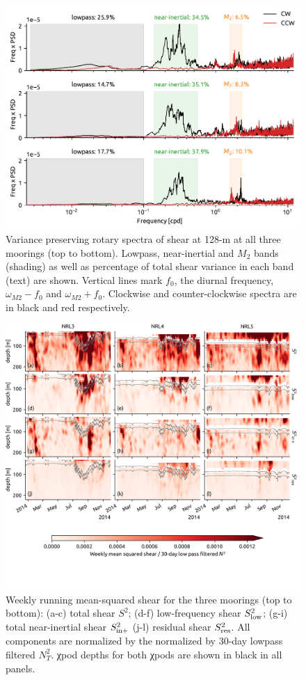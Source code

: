 \documentclass[twocol]{ametsoc}
\begin{document}
\begin{figure}
\centering
\includegraphics[width=39pc]{figure4-nrl-spectra.pdf}
\caption{\label{fig:nrlspectra}
Variance preserving rotary spectra of shear at 128-m at all three moorings (top to bottom). Lowpass, near-inertial and \(M_2\) bands (shading) as well as percentage of total shear variance in each band (text) are shown. Vertical lines mark \(f_0\), the diurnal frequency, \(ω_{M2} - f_0\) and \(ω_{M2} + f_0\). Clockwise and counter-clockwise spectra are in black and red respectively.}
\end{figure}

\begin{figure}
\centering
\includegraphics[width=\textwidth]{figure5-shears.png}
\caption{\label{fig:shears}
Weekly running mean-squared shear for the three moorings (top to bottom): (a-c) total shear \(S^2\); (d-f) low-frequency shear \(S_\text{low}^2\); (g-i) total near-inertial shear \(S_\text{in+}^2\) (j-l) residual shear \(S_\text{res}^2\). All components are normalized by the normalized by 30-day lowpass filtered \(N^2_T\). χpod depths for both χpods are shown in black in all panels.}
\end{figure}
\end{document}
